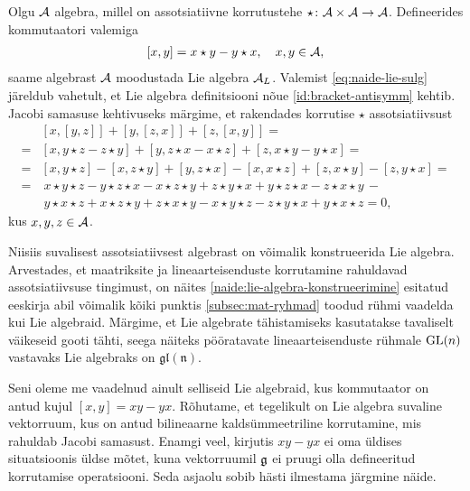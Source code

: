 \begin{naide}\label{naide:lie-algebra-konstrueerimine}
    Olgu $\mathcal{A}$ algebra, millel on assotsiatiivne korrutustehe
    $\star \colon \mathcal{A} \times \mathcal{A} \to \mathcal{A}$. Defineerides kommutaatori valemiga
    \begin{align}\label{eq:naide-lie-sulg}
        [x, y] = x \star y - y \star x,\quad x, y \in \mathcal{A},
    \end{align}
    saame algebrast $\mathcal{A}$ moodustada Lie algebra $\mathcal{A}_L$. Valemist
    \eqref{eq:naide-lie-sulg} järeldub vahetult, et Lie algebra
    definitsiooni nõue \eqref{id:bracket-antisymm} kehtib. Jacobi samasuse
    kehtivuseks märgime, et rakendades korrutise $\star$ assotsiatiivsust
    \begin{align*}
        &\left[x, \left[y, z\right]\right] + 
            \left[y, \left[z, x\right]\right] + 
            \left[z, \left[x, y\right]\right] = \\
        =& \left[x, y \star z - z \star y \right] + 
            \left[y, z \star x - x \star z \right] + 
            \left[z, x \star y - y \star x \right] = \\
        =& \left[x, y \star z\right] - \left[x, z \star y\right] + 
            \left[y, z \star x\right] - \left[x, x \star z\right] + 
            \left[z, x \star y\right] - \left[z, y \star x\right] = \\
        =&\ x \star y \star z - y \star z \star x - x \star z \star y +
            z \star y \star x + y \star z \star x - z \star x \star y\, - \\
         &\ y \star x \star z + x \star z \star y + z \star x \star y -
            x \star y \star z - z \star y \star x + y \star x \star z = 0,
    \end{align*}
    kus $x, y, z \in \mathcal{A}$.
\end{naide}

Niisiis suvalisest assotsiatiivsest algebrast on võimalik konstrueerida
Lie algebra. Arvestades, et maatriksite ja lineaarteisenduste korrutamine
rahuldavad assotsiatiivsuse tingimust, on näites
\ref{naide:lie-algebra-konstrueerimine} esitatud eeskirja abil
võimalik kõiki punktis \ref{subsec:mat-ryhmad} toodud
rühmi vaadelda kui Lie algebraid. Märgime, et Lie algebrate
tähistamiseks kasutatakse tavaliselt väikeseid gooti tähti, seega näiteks
pööratavate lineaarteisenduste rühmale $\operatorname{GL}(n)$ vastavaks Lie algebraks on
$\mathfrak{gl(n)}$.

Seni oleme me vaadelnud ainult selliseid Lie algebraid, kus kommutaator
on antud kujul $[x, y] = xy - yx$. Rõhutame, et tegelikult on Lie algebra
suvaline vektorruum, kus on antud bilineaarne kaldsümmeetriline korrutamine,
mis rahuldab Jacobi samasust. Enamgi veel, kirjutis $xy - yx$ ei oma üldises
situatsioonis üldse mõtet, kuna vektorruumil $\mathfrak{g}$ ei pruugi olla defineeritud
korrutamise operatsiooni. Seda asjaolu sobib hästi ilmestama järgmine näide.

